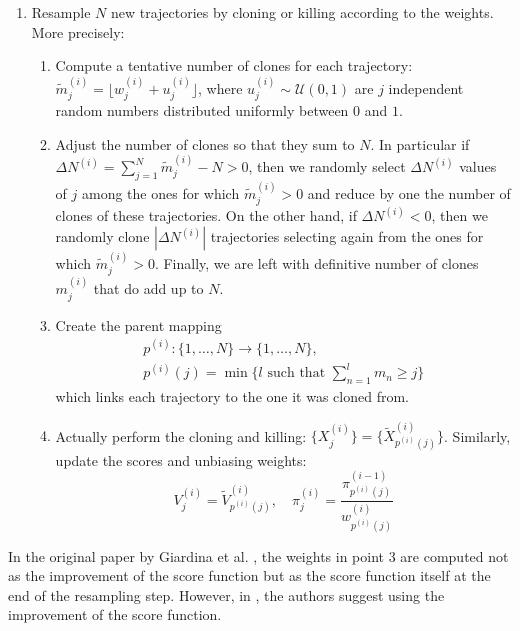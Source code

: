\begin{enumerate}
    \item Resample $N$ new trajectories by cloning or killing according to the weights. More precisely:
        \begin{enumerate}
            \item Compute a tentative number of clones for each trajectory: $\tilde{m}_j^{(i)} = \lfloor w_j^{(i)} + u_j^{(i)} \rfloor$, where $u_j^{(i)} \sim \mathcal{U}(0, 1)$ are $j$ independent random numbers distributed uniformly between $0$ and $1$.
            \item Adjust the number of clones so that they sum to $N$. In particular if $\Delta N^{(i)} = \sum_{j=1}^N \tilde{m}_j^{(i)} - N > 0$, then we randomly select $\Delta N^{(i)}$ values of $j$ among the ones for which $\tilde{m}_j^{(i)} > 0$ and reduce by one the number of clones of these trajectories. On the other hand, if $\Delta N^{(i)} < 0$, then we randomly clone $| \Delta N^{(i)} |$ trajectories selecting again from the ones for which $\tilde{m}_j^{(i)} > 0$. Finally, we are left with definitive number of clones $m_j^{(i)}$ that do add up to $N$.
            \item Create the parent mapping
            \begin{gather*}
                p^{(i)} : \{1, \ldots, N\} \rightarrow \{1, \ldots, N\}, \\ p^{(i)}(j) = \min \{l \text{ such that } \sum_{n=1}^l m_n \geq j\}
            \end{gather*}
            which links each trajectory to the one it was cloned from.
            \item Actually perform the cloning and killing: $\{X^{(i)}_j\} = \{\tilde{X}^{(i)}_{p^{(i)}(j)}\} $.
            Similarly, update the scores and unbiasing weights:
            $$V_j^{(i)} = \tilde{V}^{(i)}_{p^{(i)}(j)}, \quad \pi_j^{(i)} = \frac{\pi_{p^{(i)}(j)}^{(i-1)}}{w^{(i)}_{p^{(i)}(j)}}$$
        \end{enumerate}
\end{enumerate}

In the original paper by Giardina et al. \cite{GIA11}, the weights in point 3 are computed not as the improvement of the score function but as the score function itself at the end of the resampling step. However, in \cite{GAR06}, the authors suggest using the improvement of the score function. 

